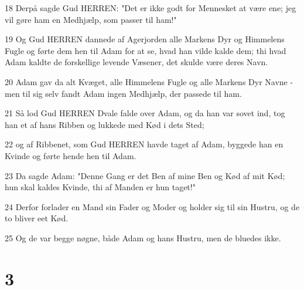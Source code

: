 \par 18 Derpå sagde Gud HERREN: "Det er ikke godt for Mennesket at være ene; jeg vil gøre ham en Medhjælp, som passer til ham!"
\par 19 Og Gud HERREN dannede af Agerjorden alle Markens Dyr og Himmelens Fugle og førte dem hen til Adam for at se, hvad han vilde kalde dem; thi hvad Adam kaldte de forskellige levende Væsener, det skulde være deres Navn.
\par 20 Adam gav da alt Kvæget, alle Himmelens Fugle og alle Markens Dyr Navne - men til sig selv fandt Adam ingen Medhjælp, der passede til ham.
\par 21 Så lod Gud HERREN Dvale falde over Adam, og da han var sovet ind, tog han et af hans Ribben og lukkede med Kød i dets Sted;
\par 22 og af Ribbenet, som Gud HERREN havde taget af Adam, byggede han en Kvinde og førte hende hen til Adam.
\par 23 Da sagde Adam: "Denne Gang er det Ben af mine Ben og Kød af mit Kød; hun skal kaldes Kvinde, thi af Manden er hun taget!"
\par 24 Derfor forlader en Mand sin Fader og Moder og holder sig til sin Hustru, og de to bliver eet Kød.
\par 25 Og de var begge nøgne, både Adam og hans Hustru, men de bluedes ikke.

\chapter{3}

